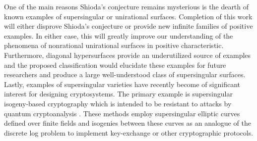 \documentclass[10pt]{amsart}
\begin{document}
One of the main reasons Shioda's conjecture remains mysterious is the dearth of known examples of supersingular or unirational surfaces. Completion of this work will either disprove Shioda's conjecture or provide new infinite families of positive examples. In either case, this will greatly improve our understanding of the phenomena of nonrational unirational surfaces in positive characteristic. Furthermore, diagonal hypersurfaces provide an underutilized source of examples and the proposed classification would elucidate these examples for future researchers and produce a large well-understood class of supersingular surfaces. Lastly, examples of supersingular varieties have recently become of significant interest for designing cryptosystems. The primary example is supersingular isogeny-based cryptography which is intended to be resistant to attacks by quantum cryptoanalysis \cite{feo_supersingular_isogeny_crypto}. These methods employ supersingular elliptic curves defined over finite fields and isogenies between these curves as an analogue of the discrete log problem to implement key-exchange or other cryptographic protocols. 




\end{document}
